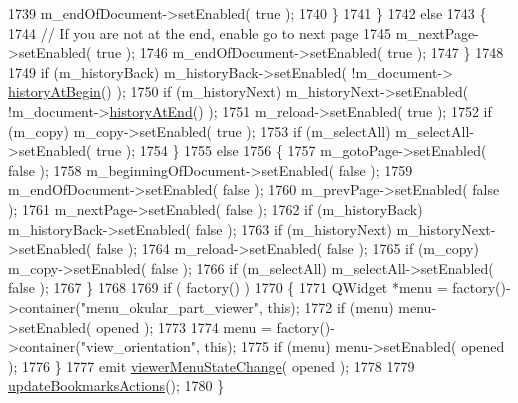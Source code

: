 \begin{DoxyCode}
1739                 m\_endOfDocument->setEnabled( \textcolor{keyword}{true} );
1740             \}
1741         \}
1742         \textcolor{keywordflow}{else} 
1743         \{
1744             \textcolor{comment}{// If you are not at the end, enable go to next page}
1745             m\_nextPage->setEnabled( \textcolor{keyword}{true} );
1746             m\_endOfDocument->setEnabled( \textcolor{keyword}{true} );
1747         \}
1748 
1749         \textcolor{keywordflow}{if} (m\_historyBack) m\_historyBack->setEnabled( !m\_document->
      \hyperlink{classOkular_1_1Document_a571e0df4ac4b081e4c81698d589163b0}{historyAtBegin}() );
1750         \textcolor{keywordflow}{if} (m\_historyNext) m\_historyNext->setEnabled( !m\_document->\hyperlink{classOkular_1_1Document_a7360baadbd779d106c38d12a3e0c911e}{historyAtEnd}() );
1751         m\_reload->setEnabled( \textcolor{keyword}{true} );
1752         \textcolor{keywordflow}{if} (m\_copy) m\_copy->setEnabled( \textcolor{keyword}{true} );
1753         \textcolor{keywordflow}{if} (m\_selectAll) m\_selectAll->setEnabled( \textcolor{keyword}{true} );
1754     \}
1755     \textcolor{keywordflow}{else}
1756     \{
1757         m\_gotoPage->setEnabled( \textcolor{keyword}{false} );
1758         m\_beginningOfDocument->setEnabled( \textcolor{keyword}{false} );
1759         m\_endOfDocument->setEnabled( \textcolor{keyword}{false} );
1760         m\_prevPage->setEnabled( \textcolor{keyword}{false} );
1761         m\_nextPage->setEnabled( \textcolor{keyword}{false} );
1762         \textcolor{keywordflow}{if} (m\_historyBack) m\_historyBack->setEnabled( \textcolor{keyword}{false} );
1763         \textcolor{keywordflow}{if} (m\_historyNext) m\_historyNext->setEnabled( \textcolor{keyword}{false} );
1764         m\_reload->setEnabled( \textcolor{keyword}{false} );
1765         \textcolor{keywordflow}{if} (m\_copy) m\_copy->setEnabled( \textcolor{keyword}{false} );
1766         \textcolor{keywordflow}{if} (m\_selectAll) m\_selectAll->setEnabled( \textcolor{keyword}{false} );
1767     \}
1768 
1769     \textcolor{keywordflow}{if} ( factory() )
1770     \{
1771         QWidget *menu = factory()->container(\textcolor{stringliteral}{"menu\_okular\_part\_viewer"}, \textcolor{keyword}{this});
1772         \textcolor{keywordflow}{if} (menu) menu->setEnabled( opened );
1773 
1774         menu = factory()->container(\textcolor{stringliteral}{"view\_orientation"}, \textcolor{keyword}{this});
1775         \textcolor{keywordflow}{if} (menu) menu->setEnabled( opened );
1776     \}
1777     emit \hyperlink{classOkular_1_1Part_aac8c46288e6db5549d51e0bd2ce38d43}{viewerMenuStateChange}( opened );
1778 
1779     \hyperlink{classOkular_1_1Part_a656b4617883cedc523c95af55fff8d21}{updateBookmarksActions}();
1780 \}
\end{DoxyCode}
